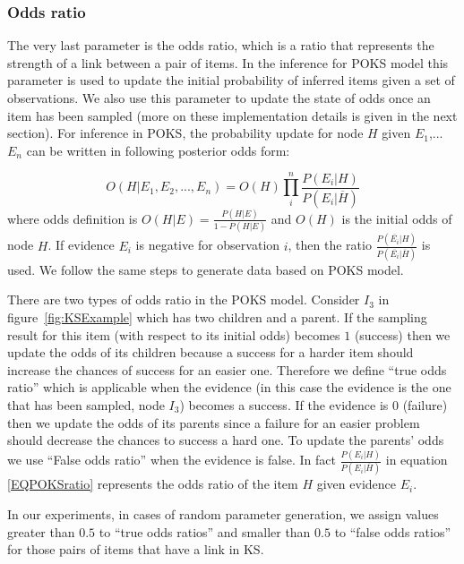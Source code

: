 \subsubsection{Odds ratio}

The very last parameter is the odds ratio, which is a ratio that represents the strength of a link between a pair of items. In the inference for POKS model this parameter is used to update the initial probability of inferred items given a set of observations. We also use this parameter to update the state of odds once an item has been sampled (more on these implementation details is given in the next section).
For inference in POKS, the probability update for node $H$ given $E_1$,... $E_n$ can be written in following posterior odds form:

\begin{equation}
O(H|E_1,E_2, ... , E_n) = O(H) \prod_{i}^{n} \frac{P(E_i|H)}{P(E_i | \overline{H})}
\label{EQPOKSratio}
\end{equation}
where odds definition is $O(H|E) = \frac{P(H|E)}{1-P(H|E)}$ and $O(H)$ is the initial odds of node $H$. If evidence $E_i$ is negative for observation $i$, then the ratio $\frac{P(\overline{E_i}|H)}{P(\overline{E_i}|\overline{H})}$ is used. We follow the same steps to generate data based on POKS model. 

There are two types of odds ratio in the POKS model. Consider $I_{3}$ in figure~\ref{fig:KSExample} which has two children and a parent. If the sampling result for this item (with respect to its initial odds) becomes $1$ (success) then we update the odds of its children because a success for a harder item should increase the chances of success for an easier one. Therefore we define ``true odds ratio'' which is applicable when the evidence (in this case the evidence is the one that has been sampled, node $I_{3}$) becomes a success. If the evidence is $0$ (failure) then we update the odds of its parents since a failure for an easier problem should decrease the chances to success a hard one. To update the parents' odds we use ``False odds ratio'' when the evidence is false. In fact $\frac{P(E_i|H)}{P(E_i | \overline{H})}$ in equation \ref{EQPOKSratio} represents the odds ratio of the item $H$ given evidence $E_i$. 

In our experiments, in cases of random parameter generation, we assign values greater than $0.5$ to ``true odds ratios'' and smaller than $0.5$ to ``false odds ratios'' for those pairs of items that have a link in KS. 

